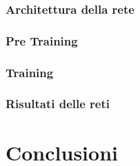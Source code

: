 \documentclass[11pt]{report}
\begin{document}
\subsection{Architettura della rete}\label{architettura}


\subsection{Pre Training}\label{pre_training}


\subsection{Training}\label{training}


\subsection{Risultati delle reti}\label{risultati_reti}









\chapter{Conclusioni}\label{conclusioni}

\end{document}
